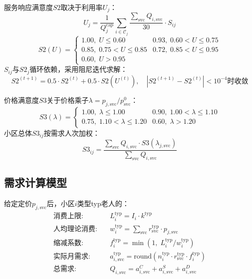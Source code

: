 \documentclass[12pt,a4paper]{article}
\begin{document}
服务响应满意度$S2$取决于利用率$U_j$：
\begin{equation}
U_j = \frac{1}{Q_j^{\text{cap}}}\sum_{i\in\mathcal{C}_j}\frac{\sum_{\text{svc}}Q_{i,\text{svc}}}{30}\cdot S_{ij}
\label{eq:U}
\end{equation}
\begin{equation}
S2(U)=
\begin{cases}
1.00,\;U\leq0.60 & 0.93,\;0.60<U\leq0.75 \\
0.85,\;0.75<U\leq0.85 & 0.72,\;0.85<U\leq0.95 \\
0.60,\;U>0.95 &
\end{cases}
\label{eq:S2}
\end{equation}
$S_{ij}$与$S2_j$循环依赖，采用阻尼迭代求解：
\begin{equation}
S2^{(t+1)} = 0.5\cdot S2^{(t)} + 0.5\cdot S2(U^{(t)}),\quad |S2^{(t+1)}-S2^{(t)}|<10^{-4}\text{时收敛}
\label{eq:S2_iter}
\end{equation}

价格满意度$S3$关于价格乘子$\lambda=p_{j,\text{svc}}/p_{\text{svc}}^0$：
\begin{equation}
S3(\lambda)=
\begin{cases}
1.00,\;\lambda\leq1.00 & 0.90,\;1.00<\lambda\leq1.10 \\
0.75,\;1.10<\lambda\leq1.20 & 0.60,\;\lambda>1.20
\end{cases}
\label{eq:S3}
\end{equation}
小区总体$S3_{ij}$按需求人次加权：
\begin{equation}
S3_{ij} = \frac{\sum_{\text{svc}}Q_{i,\text{svc}}\cdot S3(\lambda_{j,\text{svc}})}{\sum_{\text{svc}}Q_{i,\text{svc}}}
\label{eq:S3w}
\end{equation}

\subsection{需求计算模型}
给定定价$p_{j,\text{svc}}$后，小区$i$类型typ老人的：
\begin{align}
\text{消费上限:}\quad & L_i^{\text{typ}} = I_i\cdot k^{\text{typ}} \\
\text{人均理论消费:}\quad & w_i^{\text{typ}} = \sum_{\text{svc}} r_{\text{svc}}^{\text{typ}}\cdot p_{j,\text{svc}} \\
\text{缩减系数:}\quad & f_i^{\text{typ}} = \min\left(1,\; L_i^{\text{typ}}/w_i^{\text{typ}}\right) \\
\text{实际月需求:}\quad & a_{i,\text{svc}}^{\text{typ}} = \text{round}\left(n_i^{\text{typ}}\cdot r_{\text{svc}}^{\text{typ}}\cdot f_i^{\text{typ}}\right) \\
\text{总需求:}\quad & Q_{i,\text{svc}} = a_{i,\text{svc}}^C + a_{i,\text{svc}}^S + a_{i,\text{svc}}^D
\label{eq:demand}
\end{align}
\end{document}
